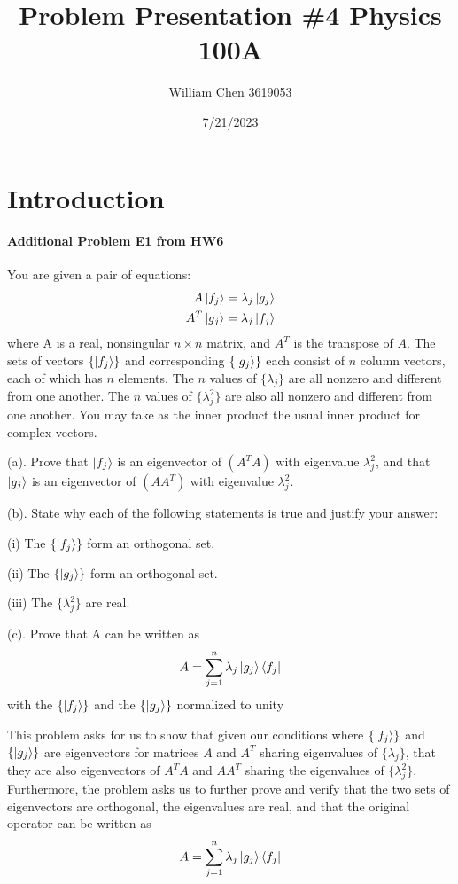 \documentclass{article}
\title{Problem Presentation \#4 Physics 100A}
\date{7/21/2023}
\author{William Chen 3619053}
\begin{document}
\maketitle

\section{Introduction}

\paragraph{Additional Problem E1 from HW6}

You are given a pair of equations:
\begin{align*}
    A \ket{f_j} = \lambda_j \ket{g_j} \\
    A^T \ket{g_j} = \lambda_j \ket{f_j}
\end{align*}
where A is a real, nonsingular $n \times n$ matrix, and $A^T$ is the transpose of $A$. The sets of vectors $\{\ket{f_j}\}$ and corresponding $\{\ket{g_j}\}$ each consist of $n$ column vectors, each of which has $n$ elements. The $n$ values of $\{\lambda_j\}$ are all nonzero and different from one another. The $n$ values of $\{\lambda^2_j\}$ are also all nonzero and different from one another. You may take as the inner product the usual inner product for complex vectors.

(a). Prove that $\ket{f_j}$ is an eigenvector of $(A^TA)$ with eigenvalue $\lambda^2_j$, and that $\ket{g_j}$ is an eigenvector of $(A A^T)$ with eigenvalue $\lambda^2_j$.

(b). State why each of the following statements is true and justify your answer:

(i) The $\{\ket{f_j}\}$ form an orthogonal set.

(ii) The $\{\ket{g_j}\}$ form an orthogonal set.

(iii) The $\{\lambda^2_j\}$ are real.

(c). Prove that A can be written as
\begin{align*}
    A = \sum_{j=1}^n \lambda_j \ket{g_j} \bra{f_j}
\end{align*}
with the $\{\ket{f_j}\}$ and the $\{\ket{g_j}\}$ normalized to unity


This problem asks for us to show that given our conditions where $\{\ket{f_j}\}$ and $\{\ket{g_j}\}$ are eigenvectors for matrices $A$ and $A^T$ sharing eigenvalues of $\{\lambda_j\}$, that they are also eigenvectors of $A^TA$ and $AA^T$ sharing the eigenvalues of $\{\lambda^2_j\}$. Furthermore, the problem asks us to further prove and verify that the two sets of eigenvectors are orthogonal, the eigenvalues are real, and that the original operator can be written as \begin{align*}
    A = \sum_{j=1}^n \lambda_j \ket{g_j} \bra{f_j}
\end{align*}
 
\end{document}
